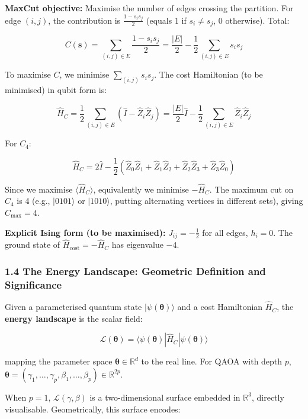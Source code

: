 \documentclass[
  11pt,
]{report}
\begin{document}
\textbf{MaxCut objective:} Maximise the number of edges crossing the
partition. For edge \((i,j)\), the contribution is
\(\frac{1 - s_i s_j}{2}\) (equals 1 if \(s_i \neq s_j\), 0 otherwise).
Total:

\[C(\mathbf{s}) = \sum_{(i,j) \in E} \frac{1 - s_i s_j}{2} = \frac{|E|}{2} - \frac{1}{2}\sum_{(i,j) \in E} s_i s_j\]

To maximise \(C\), we minimise \(\sum_{(i,j)} s_i s_j\). The cost
Hamiltonian (to be minimised) in qubit form is:

\[\hat{H}_C = \frac{1}{2}\sum_{(i,j) \in E} (\hat{I} - \hat{Z}_i \hat{Z}_j) = \frac{|E|}{2}\hat{I} - \frac{1}{2}\sum_{(i,j) \in E} \hat{Z}_i \hat{Z}_j\]

For \(C_4\):

\[\hat{H}_C = 2\hat{I} - \frac{1}{2}(\hat{Z}_0\hat{Z}_1 + \hat{Z}_1\hat{Z}_2 + \hat{Z}_2\hat{Z}_3 + \hat{Z}_3\hat{Z}_0)\]

Since we maximise \(\langle \hat{H}_C \rangle\), equivalently we
minimise \(-\hat{H}_C\). The maximum cut on \(C_4\) is 4 (e.g.,
\(|0101\rangle\) or \(|1010\rangle\), putting alternating vertices in
different sets), giving \(C_{\max} = 4\).

\textbf{Explicit Ising form (to be maximised):}
\(J_{ij} = -\frac{1}{2}\) for all edges, \(h_i = 0\). The ground state
of \(\hat{H}_{\text{cost}} = -\hat{H}_C\) has eigenvalue \(-4\).

\subsubsection{1.4 The Energy Landscape: Geometric Definition and
Significance}\label{the-energy-landscape-geometric-definition-and-significance}

Given a parameterised quantum state
\(|\psi(\boldsymbol{\theta})\rangle\) and a cost Hamiltonian
\(\hat{H}_C\), the \textbf{energy landscape} is the scalar field:

\[\mathcal{L}(\boldsymbol{\theta}) = \langle \psi(\boldsymbol{\theta}) | \hat{H}_C | \psi(\boldsymbol{\theta}) \rangle\]

mapping the parameter space \(\boldsymbol{\theta} \in \mathbb{R}^d\) to
the real line. For QAOA with depth \(p\),
\(\boldsymbol{\theta} = (\gamma_1, \ldots, \gamma_p, \beta_1, \ldots, \beta_p) \in \mathbb{R}^{2p}\).

When \(p = 1\), \(\mathcal{L}(\gamma, \beta)\) is a two-dimensional
surface embedded in \(\mathbb{R}^3\), directly visualisable.
Geometrically, this surface encodes:
\end{document}
